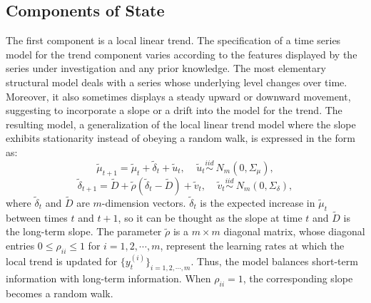\documentclass[twoside,11pt]{article}
\begin{document}
\subsection{Components of State}
The first component is a local linear trend. The specification of a time series model for the trend component varies according to the features displayed by the series under investigation and any prior knowledge. The most elementary structural model deals with
a series whose underlying level changes over time. Moreover, it also sometimes displays a steady upward or downward movement, suggesting to incorporate a slope or a drift into the model for the trend. The resulting model, a generalization of the local linear trend model where the slope exhibits stationarity instead of obeying a random walk, is expressed in the form as:
\begin{equation} \label{eq:trend}
\tilde{\mu}_{t+1}=\tilde{\mu}_t+\tilde{\delta}_t+\tilde{u}_t, \ \ \  \ \ \tilde{u}_t\stackrel{iid}\sim \  N_m(0,\Sigma_\mu),
\end{equation}
\begin{equation} \label{eq:slope}
\tilde{\delta}_{t+1}=\tilde{D}+\tilde{\rho}(\tilde{\delta}_t-\tilde{D})+\tilde{v}_t, \ \ \  \ \  \tilde{v}_t\stackrel{iid}\sim \  N_m(0,\Sigma_\delta),
\end{equation}
where $\tilde{\delta}_t$ and $ \tilde{D}$ are $m$-dimension vectors. $\tilde{\delta}_t$ is the expected increase in $\tilde{\mu}_t$  between times $t$ and $t+1$, so it can be thought as the slope at time $t$ and $\tilde{D}$ is the long-term slope. The parameter $\tilde{\rho}$
is a $m\times m$ diagonal matrix, whose diagonal entries $0\le \rho_{ii}\le1$ for $i=1,2,\cdots,m$, represent the learning rates at which the local trend is updated for $\{y_t^{(i)}\}_{i=1,2,\cdots,m}$. Thus, the model balances short-term information with long-term information.  When $\rho_{ii}=1$, the corresponding slope
becomes a random walk.
\end{document}
